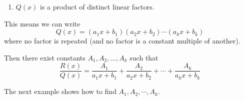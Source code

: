 \begin{frame}
\begin{enumerate}
\item  $Q(x)$ is a product of distinct linear factors.
\end{enumerate}
This means we can write
\[
Q(x) = (a_1x+b_1)(a_2x+b_2) \cdots (a_kx+b_k)
\]
where no factor is repeated (and no factor is a constant multiple of another).

Then there exist constants $A_1, A_2, \ldots , A_k$ such that
\[
\frac{R(x)}{Q(x)} = \frac{A_1}{a_1x+b_1} + \frac{A_2}{a_2x+b_2} + \cdots + \frac{A_k}{a_kx+b_k}
\]

The next example shows how to find $A_1, A_2, \cdots , A_k$.
\end{frame}
